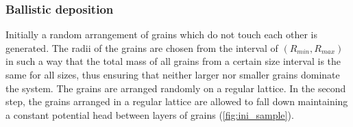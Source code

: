 \subsubsection{Ballistic deposition}
Initially a random arrangement of grains which do not touch each other is 
generated. The radii of the grains are chosen from the 
interval of $(\mathit{R}_{\mathit{min}},\mathit{R}_{\mathit{max}})$ in such a 
way that the total mass of all grains from a certain size interval is the same 
for all sizes, thus ensuring that neither larger nor smaller grains dominate 
the system. 
The 
grains are arranged randomly on a regular lattice. In the second step, the 
grains arranged in a regular lattice are allowed to fall down maintaining a 
constant potential head between layers of grains (\cref{fig:ini_sample}). 
%
%

